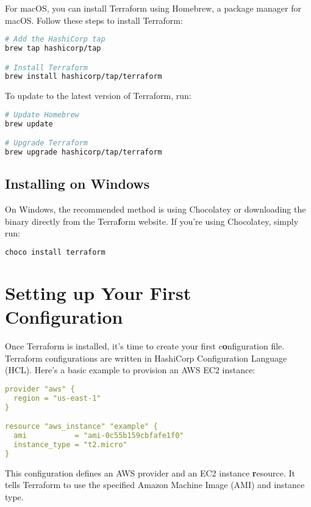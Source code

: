 For macOS, you can install Terraform using Homebrew, a package manager for macOS. Follow these steps to install Terraform:

\begin{lstlisting}[language=bash]
# Add the HashiCorp tap
brew tap hashicorp/tap

# Install Terraform
brew install hashicorp/tap/terraform
\end{lstlisting}

To update to the latest version of Terraform, run:

\begin{lstlisting}[language=bash]
# Update Homebrew
brew update

# Upgrade Terraform
brew upgrade hashicorp/tap/terraform
\end{lstlisting}

\subsection{Installing on Windows}

On Windows, the recommended method is using Chocolatey or downloading the binary directly from the Terra\textbf{f}orm website. If you're using Chocolatey, simply run:

\begin{lstlisting}[language=bash]
choco install terraform
\end{lstlisting}

\section{Setting up Your First Configuration}

Once Terraform is installed, it's time to create your first c\textbf{o}nfiguration file. Terraform configurations are written in HashiCorp Configuration Language (HCL). Here's a basic example to provision an AWS EC2 instance:

\begin{lstlisting}[language=yaml]
provider "aws" {
  region = "us-east-1"
}

resource "aws_instance" "example" {
  ami           = "ami-0c55b159cbfafe1f0"
  instance_type = "t2.micro"
}
\end{lstlisting}

This configuration defines an AWS provider and an EC2 instance \textbf{r}esource. It tells Terraform to use the specified Amazon Machine Image (AMI) and instance type.

